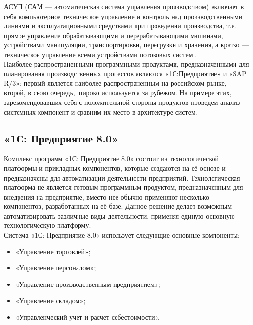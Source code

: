 \indent АСУП (САМ — автоматическая система управления производством) включает в себя компьютерное техническое управление и контроль над производственными линиями и эксплуатационными средствами при проведении производства, т.е. прямое управление обрабатывающими и перерабатывающими машинами, устройствами манипуляции, транспортировки, перегрузки и хранения, а кратко — техническое управление всеми устройствами потоковых систем \cite{gibBook}.\\
\indent Наиболее распространенными программными продуктами, предназначенными для планирования производственных процессов являются «1С:Предприятие» и «SAP R/3»: первый является наиболее распространенным на российском рынке, второй, в свою очередь, широко используется за рубежом. 
На примере этих, зарекомендовавших себя с положительной стороны продуктов проведем анализ системных компонент и сравним их место в архитектуре систем.

\subsection{«1С: Предприятие 8.0»}

\indent Комплекс программ «1С: Предприятие 8.0» состоит из технологической платформы и прикладных компонентов, которые создаются на её основе и предназначены для автоматизации деятельности предприятий. 
Технологическая платформа не является готовым программным продуктом, предназначенным для внедрения на предприятие, вместо нее обычно применяют несколько компонентов, разработанных на её базе.
Данное решение делает возможным автоматизировать различные виды деятельности, применяя единую основную технологическую платформу.\\
\indent Система «1С: Предприятие 8.0» использует следующие основные компоненты:

\begin{itemize}
	\item «Управление торговлей»;
	\item «Управление персоналом»;
	\item «Управление производственным предприятием»;
	\item «Управление складом»;
	\item «Управленческий учет и расчет себестоимости».
\end{itemize}

